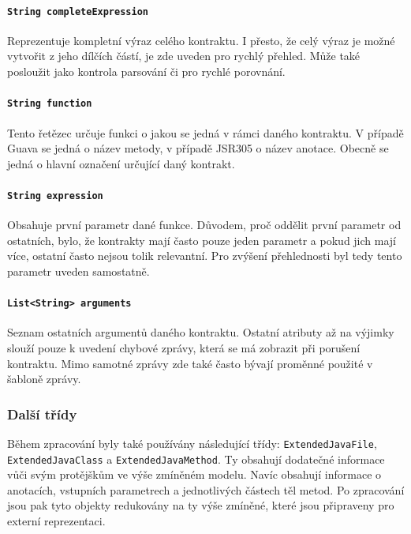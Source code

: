 					\paragraph{\texttt{String completeExpression}} 
						Reprezentuje kompletní výraz celého kontraktu. I přesto, že celý výraz je možné vytvořit z jeho dílčích částí, je zde uveden pro rychlý přehled. Může také posloužit jako kontrola parsování či pro rychlé porovnání.
			
					\paragraph{\texttt{String function}} 
						Tento řetězec určuje funkci o jakou se jedná v rámci daného kontraktu. V případě Guava se jedná o název metody, v případě JSR305 o název anotace. Obecně se jedná o hlavní označení určující daný kontrakt.
			
					\paragraph{\texttt{String expression}} 
						Obsahuje první parametr dané funkce. Důvodem, proč oddělit první parametr od ostatních, bylo, že kontrakty mají často pouze jeden parametr a pokud jich mají více, ostatní často nejsou tolik relevantní. Pro zvýšení přehlednosti byl tedy tento parametr uveden samostatně.
			
					\paragraph{\texttt{List<String> arguments}} 
						Seznam ostatních argumentů daného kontraktu. Ostatní atributy až na výjimky slouží pouze k uvedení chybové zprávy, která se má zobrazit při porušení kontraktu. Mimo samotné zprávy zde také často bývají proměnné použité v šabloně zprávy.
					
				\subsubsection{Další třídy} 
					Během zpracování byly také používány následující třídy: \texttt{ExtendedJavaFile}, \texttt{ExtendedJavaClass} a \texttt{ExtendedJavaMethod}. Ty obsahují dodatečné informace vůči svým protějškům ve výše zmíněném modelu. Navíc obsahují informace o anotacích, vstupních parametrech a jednotlivých částech těl metod. Po zpracování jsou pak tyto objekty redukovány na ty výše zmíněné, které jsou připraveny pro externí reprezentaci.
		

